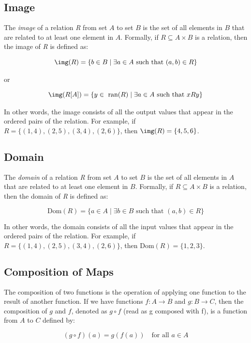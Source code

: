 \subsection{Image}

The \emph{image} of a relation \emph{R} from set \(A\) to set \(B\) is the set 
of all elements in \(B\) that are related to at least one element in \(A\). Formally, if 
\(R \subseteq A \times B\) is a relation, then the image of \emph{R} is defined as:

\[
	\img(R) = \{b \in B \mid \exists a \in A \text{ such that } (a,b) \in R\}
\]

or 

\[
	\img(R[A]) = \{y \in \text{ ran}(R) \mid \exists a \in A \text{ such that } xRy\}
\]

In other words, the image consists of all the output values that appear in the ordered pairs of the 
relation. For example, if \(R = \{(1,4), (2,5), (3,4), (2,6)\}\), then \(\img(R) = \{4, 5, 6\}\).

\subsection{Domain}

The \emph{domain} of a relation \emph{R} from set \(A\) to set \(B\) is the set of all elements in 
\(A\) that are related to at least one element in \(B\). Formally, if \(R \subseteq A \times B\) 
is a relation, then the domain of \emph{R} is defined as:

\[
	\text{Dom}(R) = \{a \in A \mid \exists b \in B \text{ such that } (a,b) \in R\}
\]

In other words, the domain consists of all the input values that appear in the ordered pairs of the 
relation. For example, if \(R = \{(1,4), (2,5), (3,4), (2,6)\}\), then \(\text{Dom}(R) = \{1, 2, 3\}\).

\subsection{Composition of Maps}

The composition of two functions is the operation of applying one function to the result of another 
function. If we have functions \(f: A \to B\) and \(g: B \rightarrow C\), then the composition of \(g\) 
and \(f\), denoted as \(g \circ f\) (read as g composed with f), is a function from \(A\) to \(C\) defined 
by:

\[
	(g \circ f)(a) = g(f(a)) \quad \text{for all } a \in A
\]

